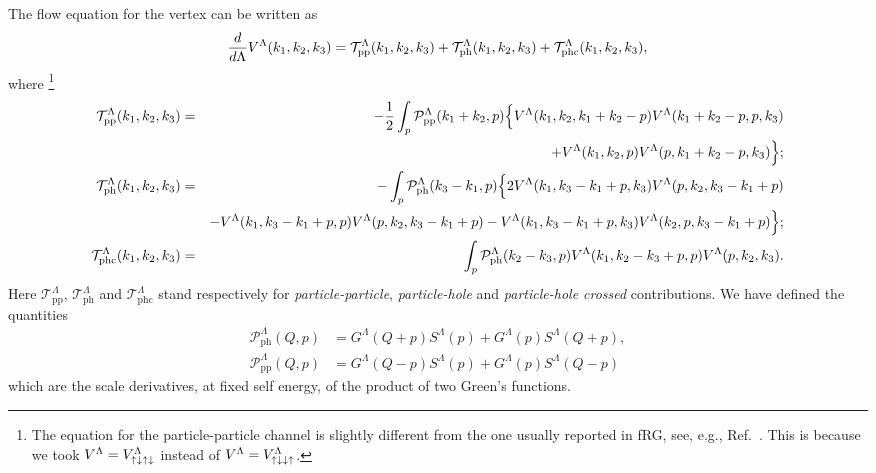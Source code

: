 \begin{widetext} 
The flow equation for the vertex can be written as \cite{Metzner2012, Husemann2009}
\begin{align}
\label{eq:vertflow}
 \frac{d}{d\Lambda}V^\Lambda(k_1,k_2,k_3) = \mathcal{T}^{\Lambda}_{\mathrm{pp} }(k_1,k_2,k_3) +  
  \mathcal{T}^{\Lambda}_{\mathrm{ph} }(k_1,k_2,k_3) + \mathcal{T}^{\Lambda}_{\mathrm{phc} }(k_1,k_2,k_3),
\end{align} 
where \footnote{The equation for the particle-particle channel is slightly different from the one usually reported in fRG, see, e.g., Ref.~. This is because we took $V^{\Lambda}_{\mathrm{} } = V^{\Lambda}_{\mathrm{\uparrow \downarrow \uparrow\downarrow} }$ instead of $V^{\Lambda}_{\mathrm{} } = V^{\Lambda}_{\mathrm{\uparrow\downarrow\downarrow\uparrow} }$.}
\begin{eqnarray}
\label{eq:ppT} 
\mathcal{T}^{\Lambda}_{\mathrm{pp} }(k_1,k_2,k_3) &=&-\frac{1}{2} \int_p \mathcal{P}^{\Lambda}_{\mathrm{\mathrm{pp}} }(k_1+k_2,p) \Big\{  V^{\Lambda}_{\mathrm{} }(k_1,k_2,k_1+k_2-p)V^{\Lambda}_{\mathrm{} }(k_1+k_2-p,p,k_3) 
\label{eq:tpp} 
   \\ 
\nonumber
&&+  V^{\Lambda}_{\mathrm{} }(k_1,k_2,p)V^{\Lambda}_{\mathrm{} }(p,k_1+k_2-p,k_3) \Big\} ; \\  
\label{eq:tph} 
\mathcal{T} ^{\Lambda}_{\mathrm{ph} }(k_1,k_2,k_3) & =& -\int_p \mathcal{P}^{\Lambda}_{\mathrm{\mathrm{ph}} }(k_3-k_1,p)
\Big\{ 2 V^{\Lambda}_{\mathrm{} }( k_1,k_3-k_1+p,k_3)  V^{\Lambda}_{\mathrm{} }(p,k_2,k_3-k_1+p) \\
\nonumber
&&- V^{\Lambda}_{\mathrm{} }( k_1,k_3-k_1+p,p)  V^{\Lambda}_{\mathrm{} }(p,k_2,k_3-k_1+p) - V^{\Lambda}_{\mathrm{} }( k_1,k_3-k_1+p,k_3)  V^{\Lambda}_{\mathrm{} }(k_2,p,k_3-k_1+p) \Big\}; \\
\label{eq:tphc}
\mathcal{T}^{\Lambda}_{\mathrm{phc} }(k_1,k_2,k_3) & =& \int_p \mathcal{P}^{\Lambda}_{\mathrm{\mathrm{ph}} }(k_2-k_3,p) V^{\Lambda}_{\mathrm{} }(k_1,k_2-k_3+p,p)
V^{\Lambda}_{\mathrm{} }(p,k_2,k_3).
\end{eqnarray} 
Here $\mathcal{T}^\Lambda_{\mathrm{pp}}$, $\mathcal{T}^\Lambda_{\mathrm{ph}}$ and $\mathcal{T}^\Lambda_{\mathrm{phc}}$ stand respectively for \textit{particle-particle}, \textit{particle-hole} and \textit{particle-hole crossed} contributions.
We have defined the quantities
\begin{align}
 \mathcal{P}_{\mathrm{ph}}^\Lambda(Q,p) &= G^\Lambda(Q+p)S^\Lambda(p) + G^\Lambda(p) S^\Lambda(Q+p), \\ 
 \mathcal{P}_{\mathrm{pp}}^\Lambda(Q,p) &=G^\Lambda(Q-p)S^\Lambda(p) + G^\Lambda(p) S^\Lambda(Q-p) 
\end{align} 
which are the scale derivatives, at fixed self energy, of the product of two Green's functions. %

\end{widetext}

